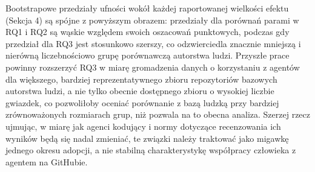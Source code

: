 Bootstrapowe przedziały ufności wokół każdej raportowanej wielkości efektu (Sekcja 4) są spójne z powyższym obrazem: przedziały dla porównań parami w RQ1 i RQ2 są wąskie względem swoich oszacowań punktowych, podczas gdy przedział dla RQ3 jest stosunkowo szerszy, co odzwierciedla znacznie mniejszą i nierówną liczebnościowo grupę porównawczą autorstwa ludzi. Przyszłe prace powinny rozszerzyć RQ3 w miarę gromadzenia danych o korzystaniu z agentów dla większego, bardziej reprezentatywnego zbioru repozytoriów bazowych autorstwa ludzi, a nie tylko obecnie dostępnego zbioru o wysokiej liczbie gwiazdek, co pozwoliłoby oceniać porównanie z bazą ludzką przy bardziej zrównoważonych rozmiarach grup, niż pozwala na to obecna analiza. Szerzej rzecz ujmując, w miarę jak agenci kodujący i normy dotyczące recenzowania ich wyników będą się nadal zmieniać, te związki należy traktować jako migawkę jednego okresu adopcji, a nie stabilną charakterystykę współpracy człowieka z agentem na GitHubie.
